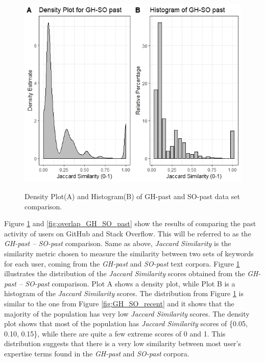         \begin{figure}
          \centering
          \includegraphics[width=\textwidth]{figures/GH_SO_past.jpeg}\\
          \caption{Density Plot(A) and Histogram(B) of GH-past and SO-past data set comparison.}
          \label{fig:GH_SO_past}
        \end{figure}
        
        Figure \ref{fig:GH_SO_past} and \ref{fig:overlap_GH_SO_past} show the results of comparing the past activity of users on GitHub and Stack Overflow. This will be referred to as the \emph{GH-past -- SO-past} comparison. Same as above, \emph{Jaccard Similarity} is the similarity metric chosen to measure the similarity between two sets of keywords for each user, coming from the \emph{GH-past} and \emph{SO-past} text corpora. Figure \ref{fig:GH_SO_past} illustrates the distribution of the \emph{Jaccard Similarity} scores obtained from the \emph{GH-past -- SO-past} comparison. Plot A shows a density plot, while Plot B is a  histogram of the \emph{Jaccard Similarity} scores. The distribution from Figure \ref{fig:GH_SO_past} is similar to the one from Figure \ref{fig:GH_SO_recent} and it shows that the majority of the population has very low \emph{Jaccard Similarity} scores. The density plot shows that most of the population has \emph{Jaccard Similarity} scores of \{0.05, 0.10, 0.15\}, while there are quite a few extreme scores of 0 and 1. This distribution suggests that there is a very low similarity between most user's expertise terms found in the \emph{GH-past} and \emph{SO-past} corpora. 
        
